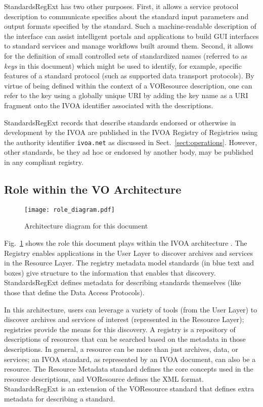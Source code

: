 \documentclass[11pt,a4paper]{ivoa}
\begin{document}
StandardsRegExt has two other purposes.  First, it allows a service
protocol description to communicate specifics about the standard input
parameters and output formats specified by the standard.  Such a
machine-readable description of the interface can assist intelligent
portals and applications to build GUI interfaces to standard services
and manage workflows built around them.  Second, it allows for the
definition of small controlled sets of standardized names (referred to
as \emph{keys} in this document) which might be used to identify,
for example, specific features of a standard protocol (such as
supported data transport protocols).  By virtue of being defined
within the context of a VOResource description, one can refer to the
key using a globally unique URI by adding the key name as a URI fragment
onto the IVOA identifier associated with the
descriptions.



StandardsRegExt records that describe standards
endorsed or otherwise in development by the IVOA are published in
the IVOA Registry of Registries \citep{2007ivoa.rept.0628P} using the
authority identifier \texttt{ivoa.net} as discussed in
Sect.~\ref{sect:operations}.
However, other standards, be they ad hoc or endorsed by another
body, may be published in any compliant registry.



\subsection{Role within the VO Architecture}

\begin{figure}
\centering
\texttt{[image: role\_diagram.pdf]}
\caption{Architecture diagram for this document}
\label{fig:archdiag}
\end{figure}

Fig.~\ref{fig:archdiag} shows the role this document plays within the
IVOA architecture \citep{2021ivoa.spec.1101D}.
The Registry enables applications in the User Layer to discover
archives and services in the Resource Layer.  The registry metadata
model standards (in blue text and boxes) give structure to the
information that enables that discovery.  StandardsRegExt defines metadata
for describing standards themselves (like those that define the Data
Access Protocols).



In this architecture, users can leverage a variety of tools (from the
User Layer) to discover archives and services of interest (represented
in the Resource Layer); registries provide the means for this
discovery. A registry is a repository of descriptions of resources
that can be searched based on the metadata in those descriptions. In
general, a resource can be more than just archives, data, or
services; an IVOA standard, as represented by an IVOA document, can
also be a resource.  The Resource Metadata standard
defines the core concepts used in the resource
descriptions, and VOResource defines
the XML format.  StandardsRegExt is an extension of the VOResource
standard that defines extra metadata for describing a standard.
\end{document}
